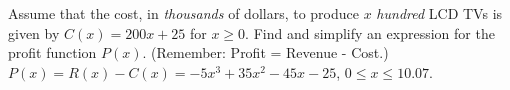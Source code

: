 {Assume that the cost, in \textit{thousands} of dollars, to produce $x$ \textit{hundred} LCD TVs is given by $C(x) = 200x + 25$ for $x \geq 0$. Find and simplify an expression for the profit function $P(x)$.  (Remember: Profit = Revenue - Cost.)
}
{$P(x) = R(x) - C(x) = -5x^3+35x^2-45x-25$, $0 \leq x \leq 10.07$.
}